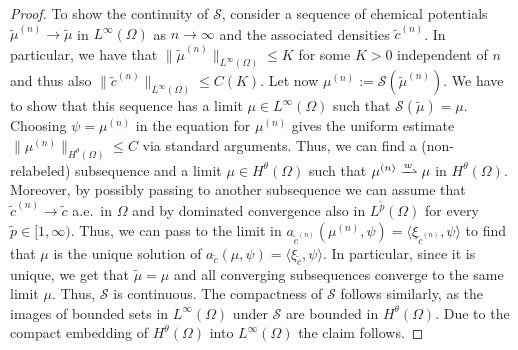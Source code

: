 \documentclass[a4paper,12pt]{article}
\newcommand{\wto}{\xrightharpoonup{w}}
\theoremstyle{plain}
\theoremstyle{definition}
\numberwithin{equation}{section}
\begin{document}
\begin{proof}
To show the continuity of $\mathcal{S}$, consider 
a sequence of chemical potentials $\widetilde\mu^{(n)}\to \widetilde \mu$ in $L^\infty(\Omega)$ as $n\to \infty$ 
and the associated
densities $\widetilde{c}^{(n)}$. In particular,
we have that $\|\widetilde \mu^{(n)}\|_{L^\infty(\Omega)}\leq K$
for some $K>0$ independent of $n$ and thus also
$\|\widetilde{c}^{(n)}\|_{L^\infty(\Omega)} \leq C(K)$. Let now $\mu^{(n)} := \mathcal{S}(\widetilde\mu^{(n)})$.
We have to show that this sequence has a limit 
$\mu\in L^\infty(\Omega)$ such that $\mathcal{S}(\widetilde{\mu})=\mu$. Choosing $\psi = \mu^{(n)}$
in the equation for $\mu^{(n)}$ gives the uniform
estimate $\|\mu^{(n)}\|_{H^\theta(\Omega)} \leq C$ via standard arguments. Thus, we can find a (non-relabeled) subsequence 
and a limit $\mu\in H^\theta(\Omega)$
such that $\mu^{(n)}\wto \mu$ in $H^\theta(\Omega)$.
Moreover, by possibly passing to another subsequence
we can assume that $\widetilde{c}^{(n)}\to \widetilde{c}$
a.e.\ in $\Omega$ and by dominated convergence
also in $L^{\tilde p}(\Omega)$ for every $\tilde{p}\in [1,\infty)$. Thus, we can pass to the limit in 
$a_{\widetilde{c}^{(n)}}(\mu^{(n)},\psi) = \langle\xi_{\widetilde{c}^{(n)}},\psi\rangle$
to find that $\mu$ is the unique solution of
$a_{\widetilde{c}}(\mu,\psi) = \langle\xi_{\widetilde{c}},\psi\rangle$.
In particular, since it is unique, we get that $\mathcal{\widetilde{\mu}}= \mu$ and all converging subsequences converge to the same limit $\mu$. Thus, $\mathcal{S}$ is continuous.
The compactness of $\mathcal{S}$ follows similarly, as
the images of bounded sets in $L^\infty(\Omega)$  
under $\mathcal{S}$ are bounded in $H^\theta(\Omega)$.
Due to the compact embedding of $H^\theta(\Omega)$
into $L^\infty(\Omega)$ the claim follows.


\end{proof}
\end{document}
